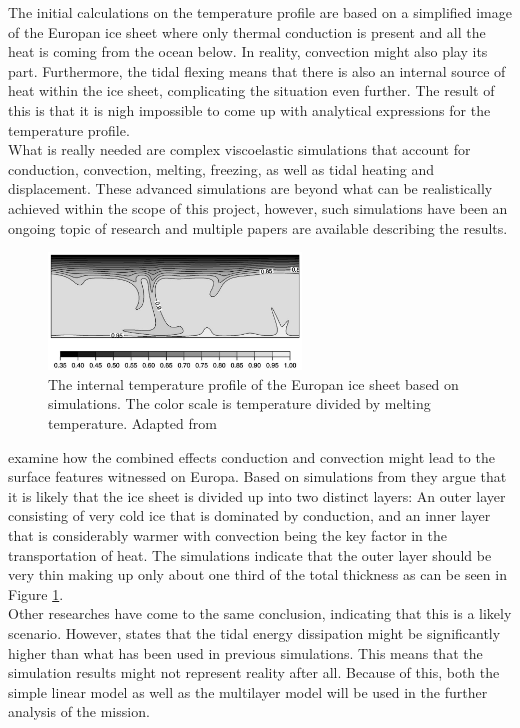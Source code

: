 \label{sec:IceTemperatureProfile2}
The initial calculations on the temperature profile are based on a simplified image of the Europan ice sheet where only thermal conduction is present and all the heat is coming from the ocean below. In reality, convection might also play its part. Furthermore, the tidal flexing means that there is also an internal source of heat within the ice sheet, complicating the situation even further. The result of this is that it is nigh impossible to come up with analytical expressions for the temperature profile.\\

\noindent
What is really needed are complex viscoelastic simulations that account for conduction, convection, melting, freezing, as well as tidal heating and displacement. These advanced simulations are beyond what can be realistically achieved within the scope of this project, however, such simulations have been an ongoing topic of research and multiple papers are available describing the results.\\

\begin{figure}[ht]
	\centering
	\includegraphics[width = 0.6\textwidth]{figures/LAMC/2layer}
	\caption{The internal temperature profile of the Europan ice sheet based on simulations. The color scale is temperature divided by melting temperature. Adapted from \cite{article:barr2014a}}
	\label{fig:2layer}
\end{figure}

\noindent 
\citet{article:barr2014a} examine how the combined effects conduction and convection might lead to the surface features witnessed on Europa. Based on simulations from \citet{article:showman2005a} they argue that it is likely that the ice sheet is divided up into two distinct layers: An outer layer consisting of very cold ice that is dominated by conduction, and an inner layer that is considerably warmer with convection being the key factor in the transportation of heat. The simulations indicate that the outer layer should be very thin making up only about one third of the total thickness as can be seen in Figure \ref{fig:2layer}. \\

\noindent
Other researches have come to the same conclusion, indicating that this is a likely scenario\cite{article:mckinnon1999a}\cite{article:tobie2003a}. However, \citet{article:mccarthy2016a} states that the tidal energy dissipation might be significantly higher than what has been used in previous simulations. This means that the simulation results might not represent reality after all. Because of this, both the simple linear model as well as the multilayer model will be used in the further analysis of the mission.
